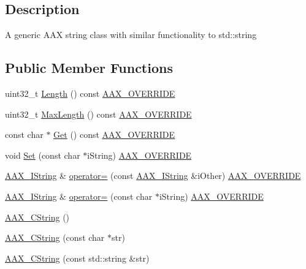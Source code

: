 \subsection{Description}
A generic A\+AX string class with similar functionality to {\ttfamily std\+::string} \subsection*{Public Member Functions}
\begin{DoxyCompactItemize}
\item 
uint32\+\_\+t \mbox{\hyperlink{a01573_a34ccfa250b53a721417f32d4a74bfed6}{Length}} () const \mbox{\hyperlink{a00392_ac2f24a5172689ae684344abdcce55463}{A\+A\+X\+\_\+\+O\+V\+E\+R\+R\+I\+DE}}
\item 
uint32\+\_\+t \mbox{\hyperlink{a01573_afa2fe6beae083e3ec266f49d7583473c}{Max\+Length}} () const \mbox{\hyperlink{a00392_ac2f24a5172689ae684344abdcce55463}{A\+A\+X\+\_\+\+O\+V\+E\+R\+R\+I\+DE}}
\item 
const char $\ast$ \mbox{\hyperlink{a01573_aa0371a2a15513a4d160d4a741c0a953e}{Get}} () const \mbox{\hyperlink{a00392_ac2f24a5172689ae684344abdcce55463}{A\+A\+X\+\_\+\+O\+V\+E\+R\+R\+I\+DE}}
\item 
void \mbox{\hyperlink{a01573_afceddbfd8955a6aa9d127c03bf488cbc}{Set}} (const char $\ast$i\+String) \mbox{\hyperlink{a00392_ac2f24a5172689ae684344abdcce55463}{A\+A\+X\+\_\+\+O\+V\+E\+R\+R\+I\+DE}}
\item 
\mbox{\hyperlink{a01873}{A\+A\+X\+\_\+\+I\+String}} \& \mbox{\hyperlink{a01573_abc8ccb77fbd70435016d4d90588bc02e}{operator=}} (const \mbox{\hyperlink{a01873}{A\+A\+X\+\_\+\+I\+String}} \&i\+Other) \mbox{\hyperlink{a00392_ac2f24a5172689ae684344abdcce55463}{A\+A\+X\+\_\+\+O\+V\+E\+R\+R\+I\+DE}}
\item 
\mbox{\hyperlink{a01873}{A\+A\+X\+\_\+\+I\+String}} \& \mbox{\hyperlink{a01573_a6970684024d6e230342a79057417de9b}{operator=}} (const char $\ast$i\+String) \mbox{\hyperlink{a00392_ac2f24a5172689ae684344abdcce55463}{A\+A\+X\+\_\+\+O\+V\+E\+R\+R\+I\+DE}}
\item 
\mbox{\hyperlink{a01573_aaa78b6da31e2540fefdd31f108262bef}{A\+A\+X\+\_\+\+C\+String}} ()
\item 
\mbox{\hyperlink{a01573_acfcad29d78267fd74592edf79bbe4b5d}{A\+A\+X\+\_\+\+C\+String}} (const char $\ast$str)
\item 
\mbox{\hyperlink{a01573_a048cec8f3bb8c1c1173f134232c01bf9}{A\+A\+X\+\_\+\+C\+String}} (const std\+::string \&str)
\item 

\end{DoxyCompactItemize}
